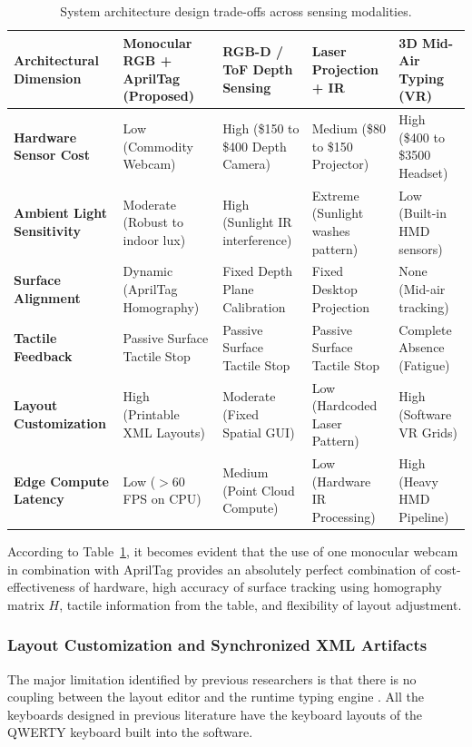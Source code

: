 \begin{table}[htbp]
\centering
\caption{System architecture design trade-offs across sensing modalities.}
\label{tab:lit_sensing_tradeoffs}
\begin{tabular}{l l l l l}
\toprule
\textbf{Architectural Dimension} & \textbf{Monocular RGB + AprilTag (Proposed)} & \textbf{RGB-D / ToF Depth Sensing} & \textbf{Laser Projection + IR} & \textbf{3D Mid-Air Typing (VR)} \\
\midrule
\textbf{Hardware Sensor Cost} & Low (Commodity Webcam) & High (\$150 to \$400 Depth Camera) & Medium (\$80 to \$150 Projector) & High (\$400 to \$3500 Headset) \\
\textbf{Ambient Light Sensitivity} & Moderate (Robust to indoor lux) & High (Sunlight IR interference) & Extreme (Sunlight washes pattern) & Low (Built-in HMD sensors) \\
\textbf{Surface Alignment} & Dynamic (AprilTag Homography) & Fixed Depth Plane Calibration & Fixed Desktop Projection & None (Mid-air tracking) \\
\textbf{Tactile Feedback} & Passive Surface Tactile Stop & Passive Surface Tactile Stop & Passive Surface Tactile Stop & Complete Absence (Fatigue) \\
\textbf{Layout Customization} & High (Printable XML Layouts) & Moderate (Fixed Spatial GUI) & Low (Hardcoded Laser Pattern) & High (Software VR Grids) \\
\textbf{Edge Compute Latency} & Low ($> 60$ FPS on CPU) & Medium (Point Cloud Compute) & Low (Hardware IR Processing) & High (Heavy HMD Pipeline) \\
\bottomrule
\end{tabular}%
\end{table}

According to Table~\ref{tab:lit_sensing_tradeoffs}, it becomes evident that the use of one monocular webcam in combination with AprilTag provides an absolutely perfect combination of cost-effectiveness of hardware, high accuracy of surface tracking using homography matrix $H$, tactile information from the table, and flexibility of layout adjustment.

\subsubsection{Layout Customization and Synchronized XML Artifacts}
The major limitation identified by previous researchers is that there is no coupling between the layout editor and the runtime typing engine \cite{ReviewVirtualKeyboard2020, Maman2023TypeNet}. All the keyboards designed in previous literature have the keyboard layouts of the QWERTY keyboard built into the software.

